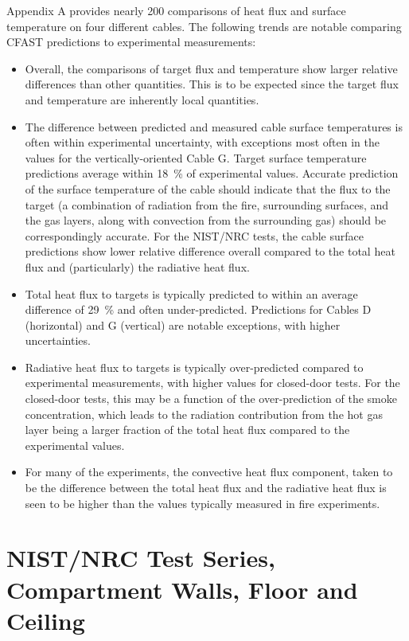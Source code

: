Appendix A provides nearly 200 comparisons of heat flux and surface temperature on four different cables.  The following trends are notable comparing CFAST predictions to experimental measurements:
\begin{itemize}
\item Overall, the comparisons of target flux and temperature show larger relative differences than other quantities. This is to be expected since the target flux and temperature are inherently local quantities.
\item The difference between predicted and measured cable surface temperatures is often within experimental uncertainty, with exceptions most often in the values for the vertically-oriented Cable G.  Target surface temperature predictions average within 18~\% of experimental values.  Accurate prediction of the surface temperature of the cable should indicate that the flux to the target (a combination of radiation from the fire, surrounding surfaces, and the gas layers, along with convection from the surrounding gas) should be correspondingly accurate.  For the NIST/NRC tests, the cable surface predictions show lower relative difference overall compared to the total heat flux and (particularly) the radiative heat flux.
\item Total heat flux to targets is typically predicted to within an average difference of 29~\% and often under-predicted.  Predictions for Cables D (horizontal) and G (vertical) are notable exceptions, with higher uncertainties.
\item Radiative heat flux to targets is typically over-predicted compared to experimental measurements, with higher values for closed-door tests.  For the closed-door tests, this may be a function of the over-prediction of the smoke concentration, which leads to the radiation contribution from the hot gas layer being a larger fraction of the total heat flux compared to the experimental values.
\item For many of the experiments, the convective heat flux component, taken to be the difference between the total heat flux and the radiative heat flux is seen to be higher than the values typically measured in fire experiments.
\end{itemize}


\section{NIST/NRC Test Series, Compartment Walls, Floor and Ceiling}

